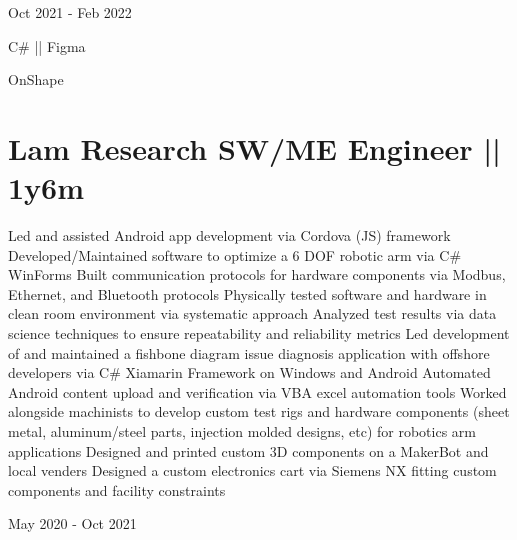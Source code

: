 \begin{subtitle}
    \vspace{-13.0ex}
    {{Oct 2021 - Feb 2022}}
\end{subtitle}

{\vspace{5ex} \color{cyan}\small {C\# || Figma}}

{
\vspace{-2.5ex}\hspace{3.17in} \color{cyan} \small
{OnShape} }
\vspace{1ex}


\section
{\textbf{Lam Research} \newline
SW/ME Engineer || 1y6m}{}

\vspace{-2.5ex}
\begin{detail}
    \BulletItem
    Led and assisted Android app development via Cordova (JS) framework
    \BulletItem
    Developed/Maintained software to optimize a 6 DOF robotic arm via C\# WinForms
    \BulletItem
    Built communication protocols for hardware components via Modbus, Ethernet, and Bluetooth protocols
    \BulletItem
    Physically tested software and hardware in clean room environment via systematic approach
    \BulletItem
    Analyzed test results via data science techniques to ensure repeatability and reliability metrics
    \BulletItem
    Led development of and maintained a fishbone diagram issue diagnosis application with offshore developers via C\# Xiamarin Framework on Windows and Android
    \BulletItem
    Automated Android content upload and verification via VBA excel automation tools
    \BulletItem
    Worked alongside machinists to develop custom test rigs and hardware components (sheet metal, aluminum/steel parts, injection molded designs, etc) for robotics arm applications
    \BulletItem
    Designed and printed custom 3D components on a MakerBot and local venders
    \BulletItem
    Designed a custom electronics cart via Siemens NX fitting custom components and facility constraints
    
\end{detail}

\begin{subtitle}
    \vspace{-34.8ex}
    {{May 2020 - Oct 2021}} 
\end{subtitle}

